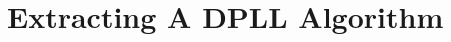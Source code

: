 \documentclass{beamer}
\newcommand{\mybar}[1]{\overline{#1}}
\begin{document}
\begin{comment}
\end{frame}




\begin{comment}
\begin{frame}
\frametitle{Typical SAT algorithm}
\medskip
$\textbf{DPLL}(\Delta, \Gamma)$
\begin{itemize}
\item $\textbf{if} \ \Delta = \emptyset \ \textbf{then}$
\begin{itemize}
\item $\textbf{return} \ \Gamma$
\end{itemize}
\item $\textbf{if} \ \emptyset \in \Delta \ \textbf{then}$
\begin{itemize}
\item $\textbf{return}\ \textrm{Unsatisfiable}$
\end{itemize}
\item $(\Delta, \Gamma_{Unit}) := \textbf{UnitPropagation}(\Delta, \Gamma)$
\item $l := \textbf{Select}(\Delta)$ 
\item $\textbf{if} \ \textbf{DPLL}(\Delta, \Gamma \cup \{ l \}) \neq \mathrm{Unsatisfiable}$
\begin{itemize}
\item $\textbf{return} \ \Gamma \cup \Gamma_{Unit} \cup \{ l \}$
\end{itemize}
\item $\textbf{else} \ \textbf{if} \ \textbf{DPLL}( \Delta, \Gamma \cup \{ \mybar{l} \}) \neq \mathrm{Unsatisfiable}$
\begin{itemize}
\item $\textbf{return} \ \Gamma \cup \Gamma_{Unit} \cup \{ \mybar{ l} \}$
\end{itemize}
\item $\textbf{else} \ \textbf{return} \mathrm{Unsatisfiable}$
\end{itemize}
\end{frame}

\end{comment}

\section{Extracting A DPLL Algorithm}
\end{document}
